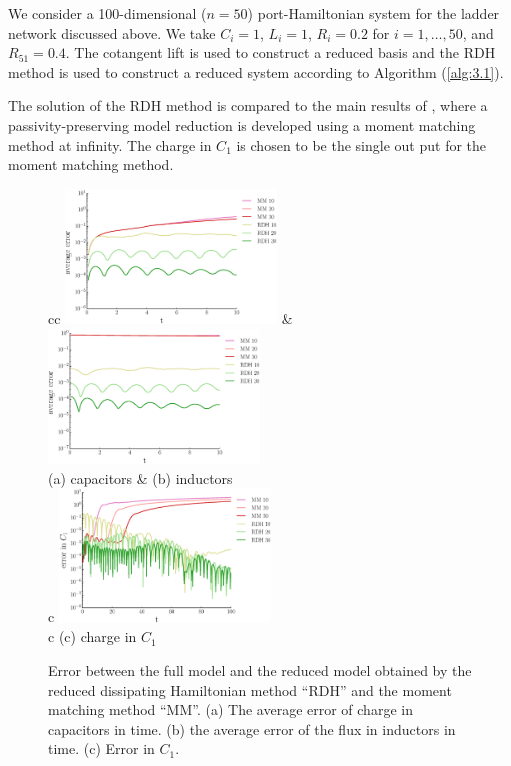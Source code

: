 We consider a 100-dimensional ($n=50$) port-Hamiltonian system for the ladder network discussed above. We take $C_i=1$, $L_i = 1$, $R_i=0.2$ for $i=1,\dots,50$, and $R_{51} = 0.4$. The cotangent lift is used to construct a reduced basis and the RDH method is used to construct a reduced system according to Algorithm (\ref{alg:3.1}). 

The solution of the RDH method is compared to the main results of \cite{Polyuga:2010gj}, where a passivity-preserving model reduction is developed using a moment matching method at infinity. The charge in $C_1$ is chosen to be the single out put for the moment matching method.

\begin{figure}[t]
\begin{tabular}{cc}
\includegraphics[width=0.5\textwidth]{./figs/porthamil/error_capac} & 
\includegraphics[width=0.5\textwidth]{./figs/porthamil/error_flux} \\
(a) capacitors & (b) inductors \\
 {c} {\includegraphics[width=0.5\textwidth]{./figs/porthamil/error1}} \\
 {c} {(c) charge in $C_1$} 
\end{tabular}
\caption{Error between the full model and the reduced model obtained by the reduced dissipating Hamiltonian method ``RDH'' and the moment matching method ``MM''. (a) The average error of charge in capacitors in time. (b) the average error of the flux in inductors in time. (c) Error in $C_1$.} \label{fig:4.3}
\end{figure}

